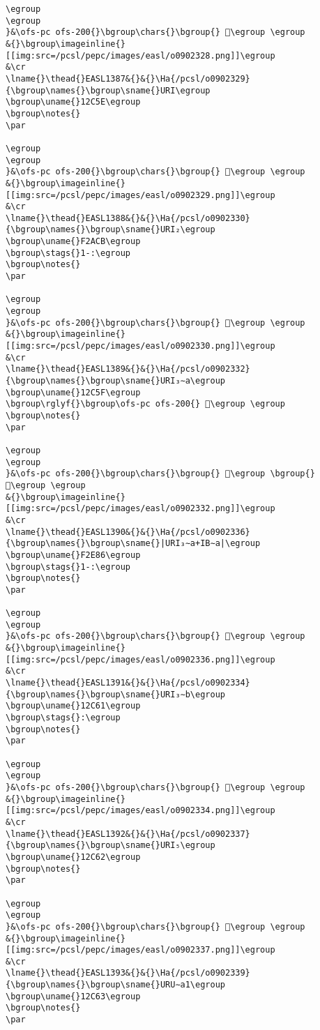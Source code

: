 \begin{verbatim}
\egroup
\egroup
}&\ofs-pc ofs-200{}\bgroup\chars{}\bgroup{} 𒱝\egroup \egroup
&{}\bgroup\imageinline{}[[img:src=/pcsl/pepc/images/easl/o0902328.png]]\egroup
&\cr
\lname{}\thead{}EASL1387&{}&{}\Ha{/pcsl/o0902329}{\bgroup\names{}\bgroup\sname{}URI\egroup
\bgroup\uname{}12C5E\egroup
\bgroup\notes{}
\par 

\egroup
\egroup
}&\ofs-pc ofs-200{}\bgroup\chars{}\bgroup{} 𒱞\egroup \egroup
&{}\bgroup\imageinline{}[[img:src=/pcsl/pepc/images/easl/o0902329.png]]\egroup
&\cr
\lname{}\thead{}EASL1388&{}&{}\Ha{/pcsl/o0902330}{\bgroup\names{}\bgroup\sname{}URI₂\egroup
\bgroup\uname{}F2ACB\egroup
\bgroup\stags{}1-:\egroup
\bgroup\notes{}
\par 

\egroup
\egroup
}&\ofs-pc ofs-200{}\bgroup\chars{}\bgroup{} 󲫋\egroup \egroup
&{}\bgroup\imageinline{}[[img:src=/pcsl/pepc/images/easl/o0902330.png]]\egroup
&\cr
\lname{}\thead{}EASL1389&{}&{}\Ha{/pcsl/o0902332}{\bgroup\names{}\bgroup\sname{}URI₃∼a\egroup
\bgroup\uname{}12C5F\egroup
\bgroup\rglyf{}\bgroup\ofs-pc ofs-200{} 𒱟\egroup \egroup
\bgroup\notes{}
\par 

\egroup
\egroup
}&\ofs-pc ofs-200{}\bgroup\chars{}\bgroup{} 𒱟\egroup \bgroup{} 𒱠\egroup \egroup
&{}\bgroup\imageinline{}[[img:src=/pcsl/pepc/images/easl/o0902332.png]]\egroup
&\cr
\lname{}\thead{}EASL1390&{}&{}\Ha{/pcsl/o0902336}{\bgroup\names{}\bgroup\sname{}|URI₃∼a+IB∼a|\egroup
\bgroup\uname{}F2E86\egroup
\bgroup\stags{}1-:\egroup
\bgroup\notes{}
\par 

\egroup
\egroup
}&\ofs-pc ofs-200{}\bgroup\chars{}\bgroup{} 󲺆\egroup \egroup
&{}\bgroup\imageinline{}[[img:src=/pcsl/pepc/images/easl/o0902336.png]]\egroup
&\cr
\lname{}\thead{}EASL1391&{}&{}\Ha{/pcsl/o0902334}{\bgroup\names{}\bgroup\sname{}URI₃∼b\egroup
\bgroup\uname{}12C61\egroup
\bgroup\stags{}:\egroup
\bgroup\notes{}
\par 

\egroup
\egroup
}&\ofs-pc ofs-200{}\bgroup\chars{}\bgroup{} 𒱡\egroup \egroup
&{}\bgroup\imageinline{}[[img:src=/pcsl/pepc/images/easl/o0902334.png]]\egroup
&\cr
\lname{}\thead{}EASL1392&{}&{}\Ha{/pcsl/o0902337}{\bgroup\names{}\bgroup\sname{}URI₅\egroup
\bgroup\uname{}12C62\egroup
\bgroup\notes{}
\par 

\egroup
\egroup
}&\ofs-pc ofs-200{}\bgroup\chars{}\bgroup{} 𒱢\egroup \egroup
&{}\bgroup\imageinline{}[[img:src=/pcsl/pepc/images/easl/o0902337.png]]\egroup
&\cr
\lname{}\thead{}EASL1393&{}&{}\Ha{/pcsl/o0902339}{\bgroup\names{}\bgroup\sname{}URU∼a1\egroup
\bgroup\uname{}12C63\egroup
\bgroup\notes{}
\par 


\end{verbatim}
